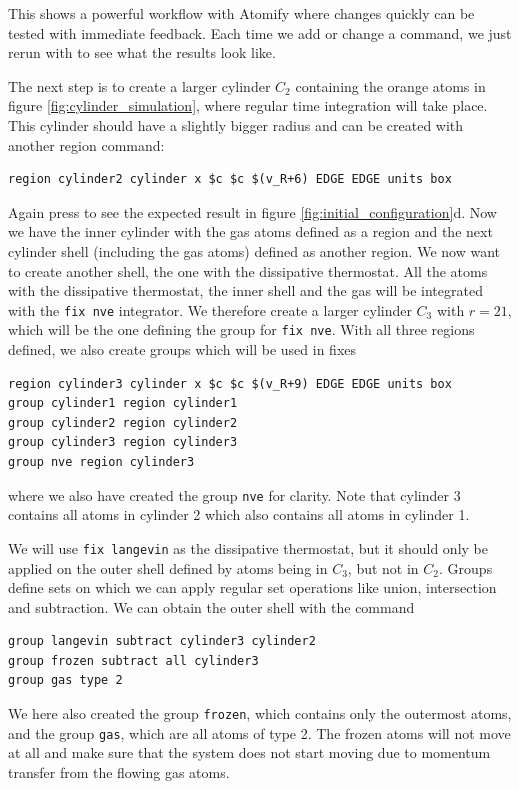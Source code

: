 \documentclass[12pt,a4paper,final]{iopart}
\newcommand{\code}[1]{\colorbox{light-gray}{\color{RawSienna}\texttt{#1}}}
\begin{document}
This shows a powerful workflow with Atomify where changes quickly can be tested with immediate feedback.
Each time we add or change a command, we just rerun with  to see what the results look like.

The next step is to create a larger cylinder $C_2$ containing the orange atoms in
figure \ref{fig:cylinder_simulation}, where regular time integration will take place.
This cylinder should have a slightly bigger radius and can be created with another region command:
%
\begin{lstlisting}
region cylinder2 cylinder x $c $c $(v_R+6) EDGE EDGE units box
\end{lstlisting}
%
Again press  to see the expected result in figure \ref{fig:initial_configuration}d.
Now we have the inner cylinder with the gas atoms defined as a region and the next cylinder shell (including the gas atoms) defined as another region.
We now want to create another shell, the one with the dissipative thermostat.
All the atoms with the dissipative thermostat, the inner shell and the gas will be integrated with the \code{fix nve} integrator.
We therefore create a larger cylinder $C_3$ with $r=21$, which will be the one defining the group for \code{fix nve}.
With all three regions defined, we also create groups which will be used in fixes
\begin{lstlisting}
region cylinder3 cylinder x $c $c $(v_R+9) EDGE EDGE units box
group cylinder1 region cylinder1
group cylinder2 region cylinder2
group cylinder3 region cylinder3
group nve region cylinder3
\end{lstlisting}
where we also have created the group \code{nve} for clarity.
Note that cylinder 3 contains all atoms in cylinder 2 which also contains all atoms in cylinder 1.

We will use \code{fix langevin}\cite{schneider1978molecular} as the dissipative thermostat,
but it should only be applied on the outer shell defined by atoms being in $C_3$, but not in $C_2$.
Groups define sets on which we can apply regular set operations like union, intersection and subtraction.
We can obtain the outer shell with the command

\begin{lstlisting}
group langevin subtract cylinder3 cylinder2
group frozen subtract all cylinder3
group gas type 2
\end{lstlisting}

We here also created the group \code{frozen}, which contains only the outermost atoms,
and the group \code{gas}, which are all atoms of type 2.
The frozen atoms will not move at all and make sure that the system does not start 
moving due to momentum transfer from the flowing gas atoms.
\end{document}
